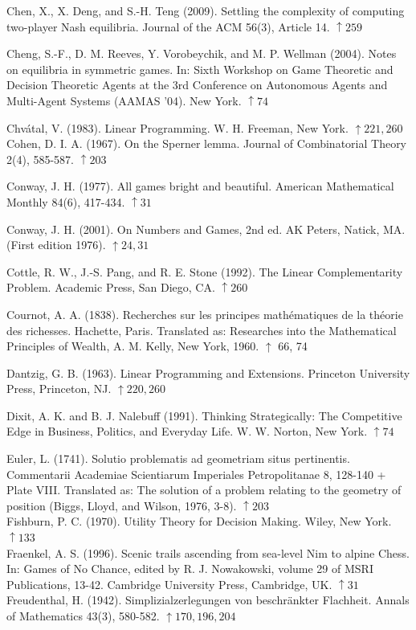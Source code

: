 \documentclass[12pt]{article}
\begin{document}
Chen, X., X. Deng, and S.-H. Teng (2009). Settling the complexity of computing two-player Nash equilibria. Journal of the ACM 56(3), Article 14. $\uparrow 259$

Cheng, S.-F., D. M. Reeves, Y. Vorobeychik, and M. P. Wellman (2004). Notes on equilibria in symmetric games. In: Sixth Workshop on Game Theoretic and Decision Theoretic Agents at the 3rd Conference on Autonomous Agents and Multi-Agent Systems (AAMAS '04). New York. $\uparrow 74$

Chvátal, V. (1983). Linear Programming. W. H. Freeman, New York. $\uparrow 221,260$\\
Cohen, D. I. A. (1967). On the Sperner lemma. Journal of Combinatorial Theory 2(4), 585-587. $\uparrow 203$

Conway, J. H. (1977). All games bright and beautiful. American Mathematical Monthly 84(6), 417-434. $\uparrow 31$

Conway, J. H. (2001). On Numbers and Games, 2nd ed. AK Peters, Natick, MA. (First edition 1976). $\uparrow 24,31$

Cottle, R. W., J.-S. Pang, and R. E. Stone (1992). The Linear Complementarity Problem. Academic Press, San Diego, CA. $\uparrow 260$

Cournot, A. A. (1838). Recherches sur les principes mathématiques de la théorie des richesses. Hachette, Paris. Translated as: Researches into the Mathematical Principles of Wealth, A. M. Kelly, New York, 1960. $\uparrow$ 66, 74

Dantzig, G. B. (1963). Linear Programming and Extensions. Princeton University Press, Princeton, NJ. $\uparrow 220,260$

Dixit, A. K. and B. J. Nalebuff (1991). Thinking Strategically: The Competitive Edge in Business, Politics, and Everyday Life. W. W. Norton, New York. $\uparrow 74$

Euler, L. (1741). Solutio problematis ad geometriam situs pertinentis. Commentarii Academiae Scientiarum Imperiales Petropolitanae 8, 128-140 + Plate VIII. Translated as: The solution of a problem relating to the geometry of position (Biggs, Lloyd, and Wilson, 1976, 3-8). $\uparrow 203$\\
Fishburn, P. C. (1970). Utility Theory for Decision Making. Wiley, New York. $\uparrow 133$\\
Fraenkel, A. S. (1996). Scenic trails ascending from sea-level Nim to alpine Chess. In: Games of No Chance, edited by R. J. Nowakowski, volume 29 of MSRI Publications, 13-42. Cambridge University Press, Cambridge, UK. $\uparrow 31$\\
Freudenthal, H. (1942). Simplizialzerlegungen von beschränkter Flachheit. Annals of Mathematics 43(3), 580-582. $\uparrow 170,196,204$
\end{document}
